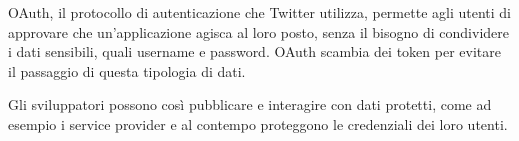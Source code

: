 		OAuth, il protocollo di autenticazione che Twitter utilizza\cite{twitter_auth}, permette agli utenti di approvare che un'applicazione agisca al loro posto, senza il bisogno di condividere i dati sensibili, quali username e password. OAuth scambia dei token per evitare il passaggio di questa tipologia di dati.

		Gli sviluppatori possono così pubblicare e interagire con dati protetti, come ad esempio i service provider e al contempo proteggono le credenziali dei loro utenti\cite{twitter_auth_faq}.

